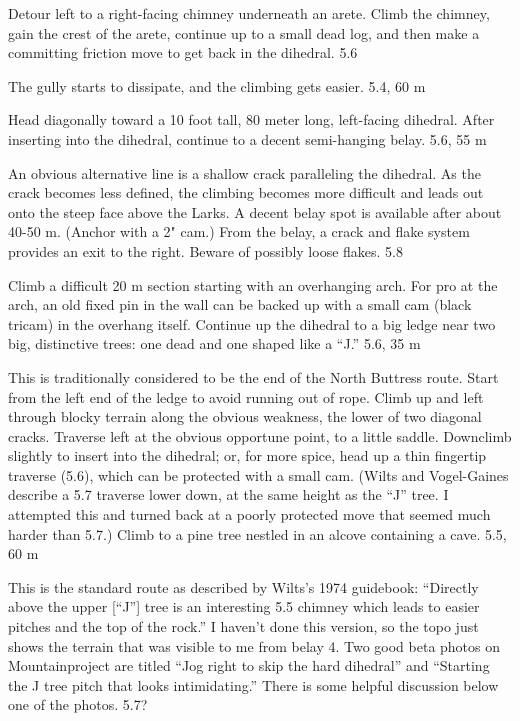 \documentclass{tahquitz}
\begin{document}
  Detour left to a right-facing chimney underneath an arete.
Climb the chimney, gain the crest of the arete, continue up
to a small dead log, and then make a committing friction
move to get back in the dihedral. 5.6

 The gully starts to dissipate, and the climbing gets easier.
5.4, 60 m

 Head diagonally toward a 10 foot tall, 80 meter long, left-facing dihedral. After
inserting into the dihedral, continue to a decent semi-hanging belay. 5.6, 55 m

 An obvious alternative line is a shallow crack paralleling the dihedral.
As the crack becomes less defined,
the climbing becomes more difficult and leads out onto the steep face above the Larks.
A decent belay spot is available after about 40-50 m. (Anchor with a 2" cam.)
From the belay, a crack and flake system provides an exit to the right. 
Beware of possibly loose flakes. 5.8

 Climb a difficult 20 m section starting with an overhanging
arch.  For pro at the arch, an old fixed pin in the wall can be
backed up with a small cam (black tricam) in the overhang itself.
Continue up the dihedral to a big ledge near two big, distinctive
trees: one dead and one shaped like a ``J.'' 5.6, 35 m


 This is traditionally considered to be the end of the
North Buttress route. Start from the left end of the ledge to avoid
running out of rope. Climb up and left through blocky terrain along the obvious weakness, the
lower of two diagonal cracks. Traverse left at the obvious opportune point, to a
little saddle. Downclimb slightly to insert into the dihedral; or, for more spice,
head up a thin fingertip traverse (5.6),
which can be protected with a small cam. (Wilts and Vogel-Gaines describe a 5.7 traverse lower
down, at the same height as the ``J'' tree. I attempted this and turned back at a poorly
protected move that seemed much harder than 5.7.)
Climb to a pine tree nestled in an alcove containing a cave. 5.5, 60 m

 This is the standard route as described by Wilts's 1974 guidebook:
``Directly above the upper [``J''] tree is an interesting 5.5 chimney which leads
to easier pitches and the top of the rock.''
I haven't done this version, so the topo just shows the terrain that was visible
to me from belay 4. Two good beta
photos on Mountainproject are titled ``Jog right to skip the hard dihedral''
and ``Starting the J tree pitch that looks intimidating.''
There is some helpful discussion below one of the photos. 5.7?
\end{document}
